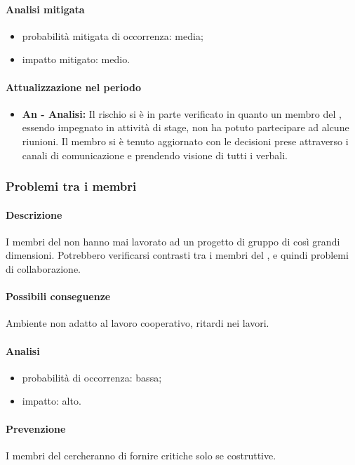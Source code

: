 			\paragraph{Analisi mitigata}
			\begin{itemize}
				\item{probabilità mitigata di occorrenza:} media;
				\item{impatto mitigato:} medio.
			\end{itemize}
			\paragraph{Attualizzazione nel periodo}
				\begin{itemize}
				\item \textbf{{An - Analisi}:} Il rischio si è in parte verificato in quanto un membro del , essendo impegnato in attività di stage, non ha potuto partecipare ad alcune riunioni. Il membro si è tenuto aggiornato con le decisioni prese attraverso i canali di comunicazione e prendendo visione di tutti i verbali.
				\end{itemize}

		\subsubsection {Problemi tra i membri}
		\label{subsec:pbmTraMembri}
			\paragraph{Descrizione}
			I membri del  non hanno mai lavorato ad un progetto di gruppo di così grandi dimensioni. Potrebbero verificarsi contrasti tra i membri del , e quindi problemi di collaborazione.
			\paragraph{Possibili conseguenze} Ambiente non adatto al lavoro cooperativo, ritardi nei lavori.
			\paragraph{Analisi}
			\begin{itemize}
			\item{probabilità di occorrenza:} bassa;
			\item{impatto:} alto.
			\end{itemize}
			\paragraph{Prevenzione} I membri del  cercheranno di fornire critiche solo se costruttive.
